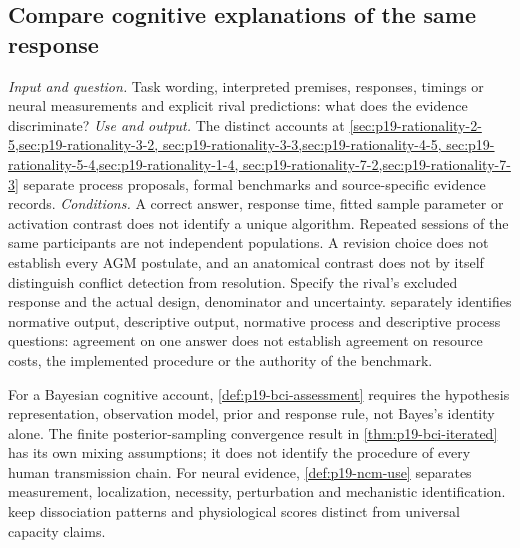 \subsection{Compare cognitive explanations of the same response}
\label{sec:p14-finder-cognitive-explanations}
\textit{Input and question.} Task wording, interpreted premises, responses,
timings or neural measurements and explicit rival predictions: what does the
evidence discriminate?
\textit{Use and output.} The distinct accounts at
\cref{sec:p19-rationality-2-5,sec:p19-rationality-3-2,
sec:p19-rationality-3-3,sec:p19-rationality-4-5,
sec:p19-rationality-5-4,sec:p19-rationality-1-4,
sec:p19-rationality-7-2,sec:p19-rationality-7-3} separate process proposals,
formal benchmarks and source-specific evidence records.
\textit{Conditions.} A correct answer, response time, fitted sample parameter
or activation contrast does not identify a unique algorithm. Repeated sessions
of the same participants are not independent populations. A revision choice
does not establish every AGM postulate, and an anatomical contrast does not
by itself distinguish conflict detection from resolution. Specify the rival's
excluded response and the actual design, denominator and uncertainty.
 separately identifies normative output,
descriptive output, normative process and descriptive process questions:
agreement on one answer does not establish agreement on resource costs,
the implemented procedure or the authority of the benchmark.

For a Bayesian cognitive account, \cref{def:p19-bci-assessment} requires
the hypothesis representation, observation model, prior and response rule,
not Bayes's identity alone. The finite posterior-sampling convergence
result in \cref{thm:p19-bci-iterated} has its own mixing assumptions;
it does not identify the procedure of every human transmission chain.
For neural evidence, \cref{def:p19-ncm-use} separates measurement,
localization, necessity, perturbation and mechanistic identification.
 keep dissociation
patterns and physiological scores distinct from universal capacity claims.

